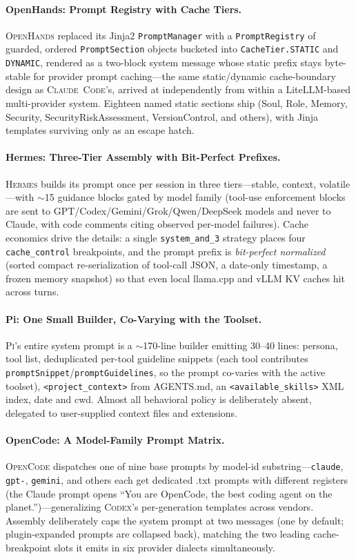 \documentclass[11pt,a4paper]{article}
\newcommand{\clcode}{\textsc{Claude~Code}\xspace}
\newcommand{\cdx}{\textsc{Codex}\xspace}
\newcommand{\oh}{\textsc{OpenHands}\xspace}
\newcommand{\hrm}{\textsc{Hermes}\xspace}
\newcommand{\pib}{\textsc{Pi}\xspace}
\newcommand{\ocd}{\textsc{OpenCode}\xspace}
\begin{document}
\paragraph{OpenHands: Prompt Registry with Cache Tiers.}
\oh{} replaced its Jinja2 \texttt{PromptManager} with a \texttt{PromptRegistry} of guarded, ordered \texttt{PromptSection} objects bucketed into \texttt{CacheTier.STATIC} and \texttt{DYNAMIC}, rendered as a two-block system message whose static prefix stays byte-stable for provider prompt caching---the same static/dynamic cache-boundary design as \clcode{}'s, arrived at independently from within a LiteLLM-based multi-provider system.
Eighteen named static sections ship (Soul, Role, Memory, Security, SecurityRiskAssessment, VersionControl, and others), with Jinja templates surviving only as an escape hatch.

\paragraph{Hermes: Three-Tier Assembly with Bit-Perfect Prefixes.}
\hrm{} builds its prompt once per session in three tiers---stable, context, volatile---with $\sim$15 guidance blocks gated by model family (tool-use enforcement blocks are sent to GPT/Codex/Gemini/Grok/Qwen/DeepSeek models and never to Claude, with code comments citing observed per-model failures).
Cache economics drive the details: a single \texttt{system\_and\_3} strategy places four \texttt{cache\_control} breakpoints, and the prompt prefix is \emph{bit-perfect normalized} (sorted compact re-serialization of tool-call JSON, a date-only timestamp, a frozen memory snapshot) so that even local llama.cpp and vLLM KV caches hit across turns.

\paragraph{Pi: One Small Builder, Co-Varying with the Toolset.}
\pib{}'s entire system prompt is a $\sim$170-line builder emitting 30--40 lines: persona, tool list, deduplicated per-tool guideline snippets (each tool contributes \texttt{promptSnippet}/\texttt{promptGuidelines}, so the prompt co-varies with the active toolset), \texttt{<project\_context>} from AGENTS.md, an \texttt{<available\_skills>} XML index, date and cwd.
Almost all behavioral policy is deliberately absent, delegated to user-supplied context files and extensions.

\paragraph{OpenCode: A Model-Family Prompt Matrix.}
\ocd{} dispatches one of nine base prompts by model-id substring---\texttt{claude}, \texttt{gpt-}, \texttt{gemini}, and others each get dedicated .txt prompts with different registers (the Claude prompt opens ``You are OpenCode, the best coding agent on the planet.'')---generalizing \cdx{}'s per-generation templates across vendors.
Assembly deliberately caps the system prompt at two messages (one by default; plugin-expanded prompts are collapsed back), matching the two leading cache-breakpoint slots it emits in six provider dialects simultaneously.
\end{document}
